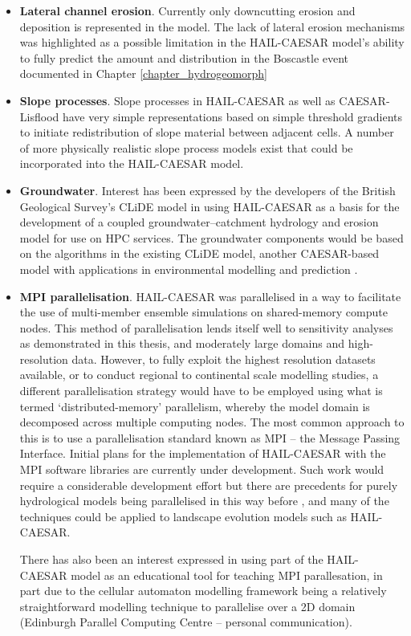 \begin{itemize}
\item \textbf{Lateral channel erosion}. Currently only downcutting erosion and deposition is represented in the model. The lack of lateral erosion mechanisms was highlighted as a possible limitation in the HAIL-CAESAR model's ability to fully predict the amount and distribution in the Boscastle event documented in Chapter \ref{chapter_hydrogeomorph}

\item \textbf{Slope processes}. Slope processes in HAIL-CAESAR as well as CAESAR-Lisflood have very simple representations based on simple threshold gradients to initiate redistribution of slope material between adjacent cells. A number of more physically realistic slope process models exist that could be incorporated into the HAIL-CAESAR model.

\item \textbf{Groundwater}. Interest has been expressed by the developers of the British Geological Survey's CLiDE model in using HAIL-CAESAR as a basis for the development of a coupled groundwater--catchment hydrology and erosion model for use on HPC services. The groundwater components would be based on the algorithms in the existing CLiDE model, another CAESAR-based model with applications in environmental modelling and prediction \citep[e.g.][]{Barkwith2015}.

\item \textbf{MPI parallelisation}. HAIL-CAESAR was parallelised in a way to facilitate the use of multi-member ensemble simulations on shared-memory compute nodes. This method of parallelisation lends itself well to sensitivity analyses as demonstrated in this thesis, and moderately large domains and high-resolution data. However, to fully exploit the highest resolution datasets available, or to conduct regional to continental scale modelling studies, a different parallelisation strategy would have to be employed using what is termed `distributed-memory' parallelism, whereby the model domain is decomposed across multiple computing nodes. The most common approach to this is to use a parallelisation standard known as MPI -- the Message Passing Interface. Initial plans for the implementation of HAIL-CAESAR with the MPI software libraries are currently under development. Such work would require a considerable development effort but there are precedents for purely hydrological models being parallelised in this way before \citep{vivoni2011real}, and many of the techniques could be applied to landscape evolution models such as HAIL-CAESAR.

There has also been an interest expressed in using part of the HAIL-CAESAR model as an educational tool for teaching MPI parallesation, in part due to the cellular automaton modelling framework being a relatively straightforward modelling technique to parallelise over a 2D domain (Edinburgh Parallel Computing Centre -- personal communication).

\end{itemize}



